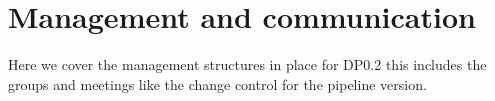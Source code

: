 \section{Management and communication} \label{sec:management}

Here we cover the management structures in place for DP0.2 this includes the groups and meetings like the change control for the pipeline version.
